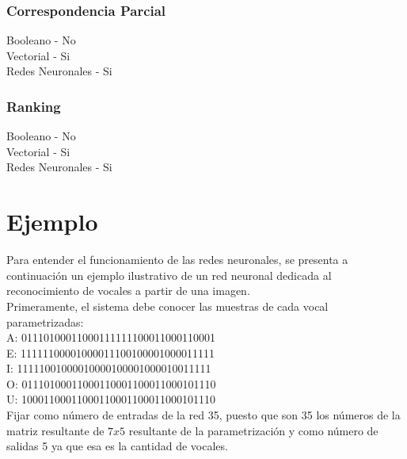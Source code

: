 \documentclass{llncs}
\begin{document}
\begin{multicols}{2}[]
\subsubsection{Correspondencia Parcial}
Booleano -  No \\
Vectorial - Si \\
Redes Neuronales - Si

\subsubsection{Ranking}
Booleano -  No \\
Vectorial - Si \\
Redes Neuronales - Si

\section{Ejemplo}

Para entender el funcionamiento de las redes neuronales, se presenta a continuaci\'on un ejemplo ilustrativo de un red neuronal dedicada al
reconocimiento de vocales a partir de una imagen.\\


Primeramente, el sistema debe conocer las muestras de cada vocal parametrizadas:\\

A: 01110100011000111111100011000110001 \\

E: 11111100001000011100100001000011111 \\

I: 11111001000010000100001000010011111 \\

O: 01110100011000110001100011000101110 \\

U: 10001100011000110001100011000101110 \\

Fijar como n\'umero de entradas de la red 35, puesto que son 35 los n\'umeros de la matriz resultante de $7x5$ resultante de la parametrizaci\'on
y como n\'umero de salidas 5 ya que esa es la cantidad de vocales.\\


\end{multicols}
\end{document}
